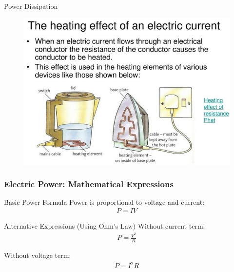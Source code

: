 \documentclass{beamer}
\begin{document}
\begin{frame}
\begin{alertblock}{Power Dissipation}
\begin{figure}
    \centering
    \includegraphics[width=1\linewidth]{reshet.png}
\end{figure}
\end{alertblock}
\end{frame}

\begin{frame}
\frametitle{Electric Power: Mathematical Expressions}
\begin{block}{Basic Power Formula}
Power is proportional to voltage and current:
\begin{align}
P = IV
\end{align}
\end{block}

\begin{block}{Alternative Expressions (Using Ohm's Law)}
Without current term:
\begin{align}
P = \frac{V^2}{R}
\end{align}

Without voltage term:
\begin{align}
P = I^2R
\end{align}
\end{block}
\end{frame}
\end{document}
